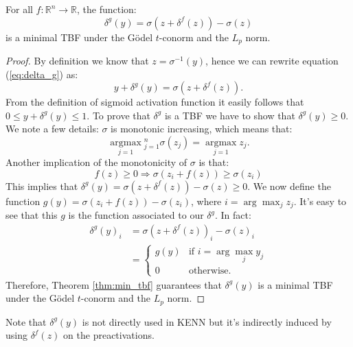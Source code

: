 \begin{theorem}
	For all $f:\mathbb{R}^n\rightarrow\mathbb{R}$, the function:
	\begin{equation}
	\delta^g(y) = \sigma(z+\delta^f(z))-\sigma(z)
	\label{eq:delta_g}
	\end{equation}
	is a minimal TBF under the Gödel $t$-conorm and the $L_p$ norm.
\end{theorem}
\begin{proof}
	By definition we know that $z = \sigma^{-1} (y)$, hence we can rewrite equation (\ref{eq:delta_g}) as:
	$$ y + \delta^g(y) = \sigma(z + \delta^f(z)).$$
	From the definition of sigmoid activation function it easily follows that $0 \leq y + \delta^g(y) \leq 1$. To prove that $\delta^g$ is a TBF we have to show that $\delta^g(y) \geq 0$.
	We note a few details: $\sigma$ is monotonic increasing, which means that:
	$$
	\underset{j=1}{\operatorname{argmax}}{ }_{j=1}^{n} \sigma\left(z_{j}\right)=\underset{j=1}{\operatorname{argmax}} z_{j}.
	$$
	Another implication of the monotonicity of $\sigma$ is that:
	$$
	f(z) \geq 0 \Rightarrow \sigma\left(z_{i}+f(z)\right) \geq \sigma\left(z_{i}\right)
	$$
	This implies that $\delta^g(y)=\sigma(z+\delta^f(z)) - \sigma(z) \geq 0$.
	We now define the function $g(y) = \sigma(z_i + f(z)) - \sigma(z_i)$, where $i = \arg\max_j z_j$. It's easy to see that this $g$ is the function associated to our $\delta^g$. In fact:
	\begin{align*}
	\delta^g(y)_i &= \sigma(z + \delta^f(z))_i - \sigma(z)_i \\
	&=\begin{cases}
	g(y) &\text{if } i=\arg\max_j y_j\\
	0 &\text{otherwise.}
	\end{cases}
	\end{align*}
	Therefore, Theorem \ref{thm:min_tbf} guarantees that $\delta^g(y)$ is a minimal TBF under the Gödel $t$-conorm and the $L_p$ norm.
	
\end{proof}

Note that $\delta^g(y)$ is not directly used in KENN but it's indirectly induced by using $\delta^f(z)$ on the preactivations. 

